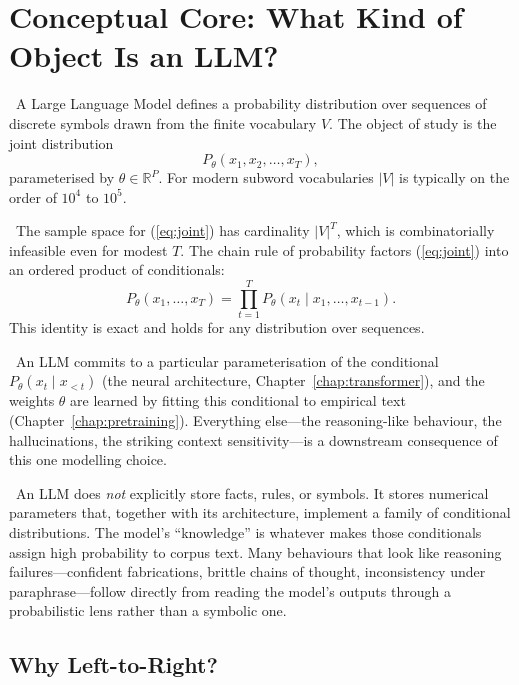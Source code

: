 \section{Conceptual Core: What Kind of Object Is an LLM?}

\Def\ A Large Language Model defines a probability distribution over
sequences of discrete symbols drawn from the finite vocabulary $V$.
The object of study is the joint distribution
\begin{equation}
P_\theta(x_1, x_2, \ldots, x_T),
\label{eq:joint}
\end{equation}
parameterised by $\theta \in \mathbb{R}^P$. For modern subword
vocabularies $|V|$ is typically on the order of $10^4$ to $10^5$.

\Ident\ The sample space for (\ref{eq:joint}) has cardinality $|V|^T$,
which is combinatorially infeasible even for modest $T$. The chain rule
of probability factors (\ref{eq:joint}) into an ordered product of
conditionals:
\begin{equation}
P_\theta(x_1, \ldots, x_T) = \prod_{t=1}^{T} P_\theta(x_t \mid x_1, \ldots, x_{t-1}).
\label{eq:chain}
\end{equation}
This identity is exact and holds for any distribution over sequences.

\Cons\ An LLM commits to a particular parameterisation of the
conditional $P_\theta(x_t \mid x_{<t})$ (the neural architecture,
Chapter~\ref{chap:transformer}), and the weights $\theta$ are learned by fitting this
conditional to empirical text (Chapter~\ref{chap:pretraining}). Everything else---the
reasoning-like behaviour, the hallucinations, the striking context
sensitivity---is a downstream consequence of this one modelling choice.

\Emp\ An LLM does \emph{not} explicitly store facts, rules, or
symbols. It stores numerical parameters that, together with its
architecture, implement a family of conditional distributions. The
model's ``knowledge'' is whatever makes those conditionals assign high
probability to corpus text. Many behaviours that look like reasoning
failures---confident fabrications, brittle chains of thought,
inconsistency under paraphrase---follow directly from reading the
model's outputs through a probabilistic lens rather than a symbolic
one.

\subsection{Why Left-to-Right?}

